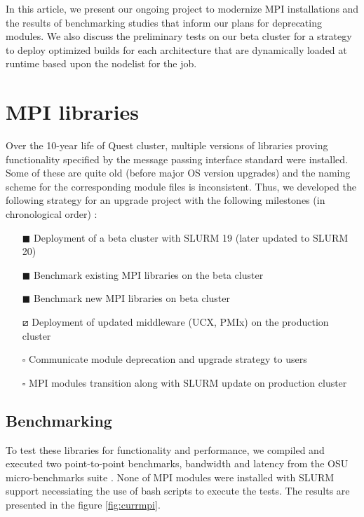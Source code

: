 \documentclass[sigconf,authordraft]{acmart}
\begin{document}
In this article, we present our ongoing project to modernize MPI installations and the results of benchmarking studies that inform our plans for deprecating modules. We also discuss the preliminary tests on our beta cluster for a strategy to deploy optimized builds for each architecture that are dynamically loaded at runtime based upon the nodelist for the job.

\section{MPI libraries}
Over the 10-year life of Quest cluster, multiple versions of libraries proving functionality specified by the message passing interface standard \cite{mpi_3_1,mpi_2_2} were installed. Some of these are quite old (before major OS version upgrades) and the naming scheme for the corresponding module files is inconsistent. Thus, we developed the following strategy for an upgrade project
with the following milestones (in chronological order) :
\begin{itemize}
	\item[$\blacksquare$] Deployment of a beta cluster with SLURM 19 (later updated to SLURM 20)
	\item[$\blacksquare$] Benchmark existing MPI libraries on the beta cluster
	\item[$\blacksquare$] Benchmark new MPI libraries on beta cluster
	\item[$\boxslash$] Deployment of updated middleware (UCX, PMIx) on the production cluster
	\item[$\square$] Communicate module deprecation and upgrade strategy to users
	\item[$\square$] MPI modules transition along with SLURM update on production cluster
\end{itemize}

\subsection{Benchmarking}

To test these libraries for functionality and performance, we compiled and executed two point-to-point benchmarks, bandwidth and latency from the OSU micro-benchmarks suite \cite{osu_bench_website}. None of MPI modules were installed with SLURM support necessiating the use of bash scripts to execute the tests. The results are presented in the figure \ref{fig:currmpi}.
\end{document}
